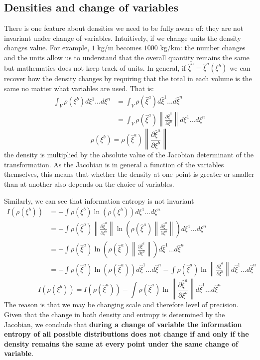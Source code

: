 \documentclass[11pt]{article}
\begin{document}
\subsection*{Densities and change of variables}

There is one feature about densities we need to be fully aware of: they are not invariant under change of variables. Intuitively, if we change units the density changes value. For example, $1$ kg/m becomes $1000$ kg/km: the number changes and the units allow us to understand that the overall quantity remains the same but mathematics does not keep track of units. In general, if $\hat{\xi}^a=\hat{\xi}^a(\xi^b)$ we can recover how the density changes by requiring that the total in each volume is the same no matter what variables are used. That is:
\begin{align*}
\int_V \rho(\xi^b) d\xi^1 ... d\xi^n &= \int_V \rho(\hat{\xi}^a) d\hat{\xi}^1 ... d\hat{\xi}^n \\
&=\int_V\rho(\hat{\xi}^a) \left\|\frac{\partial \hat{\xi}^a}{\partial \xi^b}\right\| d\xi^1 ... d\xi^n
\end{align*}
\begin{equation}\label{density_transformation}
\rho(\xi^b) = \rho(\hat{\xi}^a) \left\|\frac{\partial \hat{\xi}^a}{\partial \xi^b}\right\|
\end{equation}
the density is multiplied by the absolute value of the Jacobian determinant of the transformation. As the Jacobian is in general a function of the variables themselves, this means that whether the density at one point is greater or smaller than at another also depends on the choice of variables.

Similarly, we can see that information entropy is not invariant
\begin{align*}
I(\rho(\xi^b)) &=-\int \rho(\xi^b) \ln (\rho(\xi^b)) d\xi^1 ... d\xi^n \\
&=-\int \rho(\hat{\xi}^a) \left\|\frac{\partial \hat{\xi}^a}{\partial \xi^b}\right\| \ln \left(\rho(\hat{\xi}^a) \left\|\frac{\partial \hat{\xi}^a}{\partial \xi^b}\right\|\right) d\xi^1 ... d\xi^n \\
&=-\int \rho(\hat{\xi}^a) \ln \left(\rho(\hat{\xi}^a) \left\|\frac{\partial \hat{\xi}^a}{\partial \xi^b}\right\|\right) d\hat{\xi}^1 ... d\hat{\xi}^n \\
&=-\int \rho(\hat{\xi}^a) \ln (\rho(\hat{\xi}^a)) d\hat{\xi}^1 ... d\hat{\xi}^n -\int \rho(\hat{\xi}^a) \ln \left\|\frac{\partial \hat{\xi}^a}{\partial \xi^b}\right\| d\hat{\xi}^1 ... d\hat{\xi}^n
\end{align*}
\begin{equation}\label{entropy_transformation}
I(\rho(\xi^b)) =I(\rho(\hat{\xi}^a)) -\int \rho(\hat{\xi}^a) \ln \left\|\frac{\partial \hat{\xi}^a}{\partial \xi^b}\right\| d\hat{\xi}^1 ... d\hat{\xi}^n
\end{equation}
The reason is that we may be changing scale and therefore level of precision. Given that the change in both density and entropy is determined by the Jacobian, we conclude that \textbf{during a change of variable the information entropy of all possible distributions does not change if and only if the density remains the same at every point under the same change of variable}.
\end{document}
